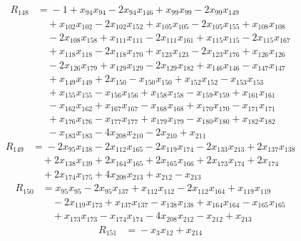 \begin{align*}
R_{148}&={}-1 +x_{94}x_{94} -2x_{94}x_{146} +x_{99}x_{99} -2x_{99}x_{149}\\
&\quad{}+x_{102}x_{102} -2x_{102}x_{152} +x_{105}x_{105} -2x_{105}x_{155} +x_{108}x_{108}\\
&\quad{}-2x_{108}x_{158} +x_{111}x_{111} -2x_{111}x_{161} +x_{115}x_{115} -2x_{115}x_{167}\\
&\quad{}+x_{118}x_{118} -2x_{118}x_{170} +x_{123}x_{123} -2x_{123}x_{176} +x_{126}x_{126}\\
&\quad{}-2x_{126}x_{179} +x_{129}x_{129} -2x_{129}x_{182} +x_{146}x_{146} -x_{147}x_{147}\\
&\quad{}+x_{149}x_{149} +2x_{150} -x_{150}x_{150} +x_{152}x_{152} -x_{153}x_{153}\\
&\quad{}+x_{155}x_{155} -x_{156}x_{156} +x_{158}x_{158} -x_{159}x_{159} +x_{161}x_{161}\\
&\quad{}-x_{162}x_{162} +x_{167}x_{167} -x_{168}x_{168} +x_{170}x_{170} -x_{171}x_{171}\\
&\quad{}+x_{176}x_{176} -x_{177}x_{177} +x_{179}x_{179} -x_{180}x_{180} +x_{182}x_{182}\\
&\quad{}-x_{183}x_{183} -4x_{208}x_{210} -2x_{210} +x_{211}
\end{align*}
\begin{align*}
R_{149}&={}-2x_{95}x_{138} -2x_{112}x_{165} -2x_{119}x_{174} -2x_{133}x_{213} +2x_{137}x_{138}\\
&\quad{}+2x_{138}x_{139} +2x_{164}x_{165} +2x_{165}x_{166} +2x_{173}x_{174} +2x_{174}\\
&\quad{}+2x_{174}x_{175} +4x_{208}x_{213} +x_{212} -x_{213}
\end{align*}
\begin{align*}
R_{150}&={}x_{95}x_{95} -2x_{95}x_{137} +x_{112}x_{112} -2x_{112}x_{164} +x_{119}x_{119}\\
&\quad{}-2x_{119}x_{173} +x_{137}x_{137} -x_{138}x_{138} +x_{164}x_{164} -x_{165}x_{165}\\
&\quad{}+x_{173}x_{173} -x_{174}x_{174} -4x_{208}x_{212} -x_{212} +x_{213}
\end{align*}
\begin{align*}
R_{151}&={}-x_{3}x_{12} +x_{214}
\end{align*}
\endgroup
